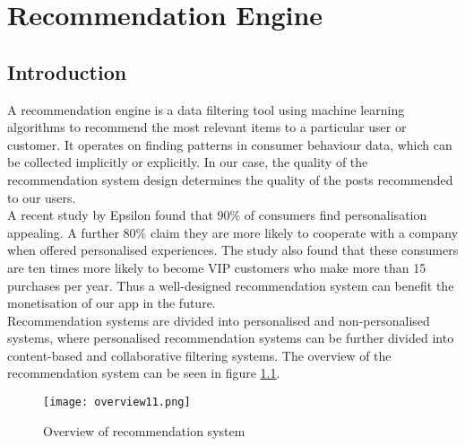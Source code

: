 


\chapter{Recommendation Engine}%
\label{Chapter6} %

\section{Introduction}
A recommendation engine is a data filtering tool using machine learning algorithms to recommend the most relevant items to a particular user or customer. 
It operates on finding patterns in consumer behaviour data, which can be collected implicitly or explicitly.\footfullcite{} In our case, the quality of the recommendation system design determines the quality of the posts recommended to our users.
\\A recent study by Epsilon found that 90\% of consumers find personalisation appealing. A further 80\% claim they are more likely to cooperate with a company when offered personalised experiences.
The study also found that these consumers are ten times more likely to become VIP customers who make more than 15 purchases per year. 
Thus a well-designed recommendation system can benefit the monetisation of our app in the future.
\\Recommendation systems are divided into personalised and non-personalised systems, where personalised recommendation systems can be further divided into content-based and collaborative filtering systems. 
The overview of the recommendation system can be seen in figure \ref{fig:overrecomm}.
\begin{figure}[ht]
\centering
\texttt{[image: overview11.png]}
\caption{Overview of recommendation system}
\label{fig:overrecomm}
\end{figure}

